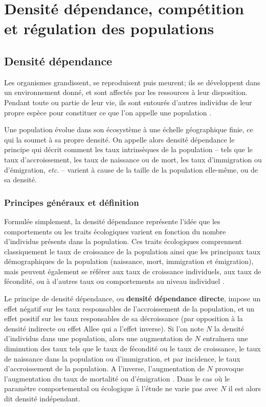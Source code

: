 \section{Densité dépendance,
compétition et régulation des populations}

\subsection{Densité dépendance}

Les organismes grandissent, se reproduisent puis meurent; ils se développent
dans un environnement donné, et sont affectés par les ressources à leur
disposition. Pendant toute ou partie de leur vie, ils sont
entourés d'autres individus de leur propre espèce pour constituer ce que l'on
appelle une population \autocites{begon2009a}. 

Une population évolue dans son écosystème à une échelle géographique finie, ce
qui la soumet à sa propre densité. On appelle alors densité
dépendance le principe qui décrit comment les taux intrinsèques de la
population -- tels que le taux d'accroissement, les taux de naissance ou de
mort, les taux d'immigration ou d'émigration, \textit{etc.} -- varient à cause
de la taille de la population elle-même, ou de sa densité.

\subsubsection{Principes généraux et définition}

Formulée simplement, la densité dépendance représente l'idée que les
comportements ou les traits écologiques varient en fonction du nombre
d'individus présents dans la population. Ces traits écologiques comprennent
classiquement le taux de croissance de la population ainsi que les principaux
taux démographiques de la population (naissance, mort, immigration et
émigration), mais peuvent également se référer aux taux de croissance
individuels, aux taux de fécondité, ou à d'autres taux ou comportements au niveau individuel
\autocites{royama1977a}.

Le principe de densité dépendance, ou \textbf{densité dépendance directe},
impose un effet négatif sur les taux responsables de l'accroissement de la population, et
un effet positif sur les taux responsables de sa décroissance (par opposition à
la densité indirecte ou effet Allee qui a l'effet inverse). Si l'on note $N$ la
densité d'individus dans une population, alors une augmentation de $N$
entraînera une diminution des taux tels que le taux de fécondité ou le taux de
croissance, le taux de naissance dans la population ou d'immigration, et par
incidence, le taux d'accroissement de la population. A l'inverse,
l'augmentation de $N$ provoque l'augmentation du taux de mortalité ou
d'émigration \autocites{hixon2009a}. Dans le cas où le paramètre comportemental
ou écologique à l'étude ne varie pas avec $N$ il est alors dit densité
indépendant.

